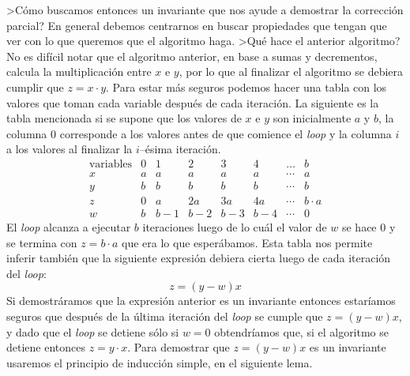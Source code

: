 >Cómo buscamos entonces un invariante que nos ayude a demostrar la corrección parcial?
En general debemos centrarnos en buscar propiedades que tengan que ver con lo que queremos que el algoritmo haga.
>Qué hace el anterior algoritmo?
No es difícil notar que el algoritmo anterior, en base a sumas y decrementos, calcula la multiplicación entre $x$ e $y$, por lo que al finalizar el algoritmo se debiera cumplir que $z=x\cdot y$.
Para estar más seguros podemos hacer una tabla con los valores que toman cada variable después de cada iteración.
La siguiente es la tabla mencionada si se supone que los valores de $x$ e $y$ son inicialmente $a$ y $b$, la columna $0$ corresponde a los valores antes de que comience el \emph{loop} y la columna $i$ a los valores al finalizar la $i$--ésima iteración.
\[
\begin{array}{c|ccccccc}
\text{variables} & 0 & 1 & 2 & 3 & 4 & \ldots & b \\ \hline
x & a & a & a &     a  & a  & \cdots & a \\
y & b & b & b &     b  & b  & \cdots & b \\
z & 0 & a & 2a &    3a & 4a & \cdots & b\cdot a \\
w & b & b-1 & b-2 & b-3& b-4& \cdots & 0
\end{array}
\]
El \emph{loop} alcanza a ejecutar $b$ iteraciones luego de lo cuál el valor de $w$ se hace $0$ y se termina con $z=b\cdot a$ que era lo que esperábamos.
Esta tabla nos permite inferir también que la siguiente expresión debiera cierta luego de cada iteración del \emph{loop}:
\[
z=(y-w)x
\]
Si demostráramos que la expresión anterior es un invariante entonces estaríamos seguros que después de la última iteración del \emph{loop} se cumple que $z=(y-w)x$, y dado que el \emph{loop} se detiene sólo si $w=0$ obtendríamos que, si el algoritmo se detiene entonces $z=y\cdot x$.
Para demostrar que $z=(y-w)x$ es un invariante usaremos el principio de inducción simple, en el siguiente lema.

